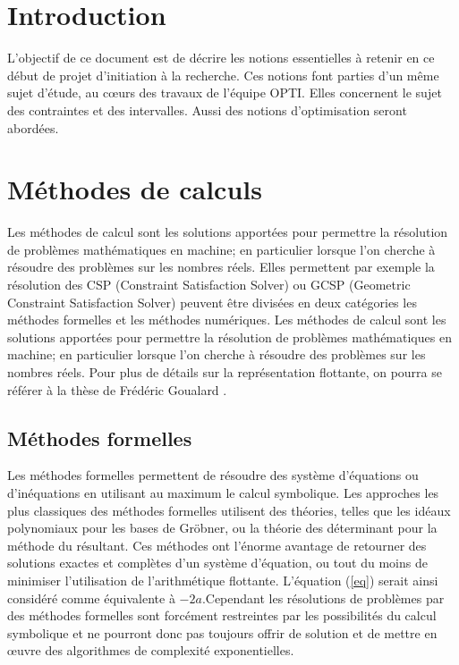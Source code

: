 \section{Introduction }
L'objectif de ce document est de décrire les notions essentielles à retenir en ce début de projet d'initiation à la recherche. Ces notions font parties d'un même sujet d'étude, au cœurs des travaux de l'équipe OPTI. Elles concernent le sujet des contraintes et des intervalles. Aussi des notions d'optimisation seront abordées.

\section{Méthodes de calculs}
Les méthodes de calcul sont les solutions apportées pour permettre la résolution de problèmes mathématiques en machine; en particulier lorsque l'on cherche à résoudre des problèmes sur les nombres réels. Elles permettent par exemple la résolution des CSP (Constraint Satisfaction Solver) ou GCSP (Geometric Constraint Satisfaction Solver) peuvent être divisées en deux catégories les méthodes formelles et les méthodes numériques. Les méthodes de calcul sont les solutions apportées pour permettre la résolution de problèmes mathématiques en machine; en particulier lorsque l'on cherche à résoudre des problèmes sur les nombres réels. Pour plus de détails sur la représentation flottante, on pourra se référer à la thèse de Frédéric Goualard \cite{Goualard}. 


\subsection{Méthodes formelles}
Les méthodes formelles permettent de résoudre des système d'équations ou d'inéquations en utilisant au maximum le calcul symbolique. Les approches les plus classiques des méthodes formelles utilisent des théories, telles que les idéaux polynomiaux pour les bases de Gröbner, ou la théorie des déterminant pour la méthode du résultant. Ces méthodes ont l'énorme avantage de retourner des solutions exactes et complètes d'un système d'équation, ou tout du moins de minimiser l'utilisation de l'arithmétique flottante. L'équation (\ref{eq}) serait ainsi considéré comme équivalente à $-2a$.Cependant les résolutions de problèmes par des méthodes formelles sont forcément restreintes par les possibilités du calcul symbolique et ne pourront donc pas toujours offrir de solution et  de mettre en œuvre des algorithmes de complexité exponentielles.


